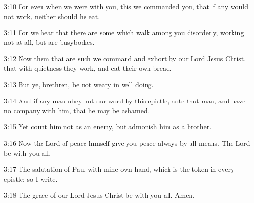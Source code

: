 3:10 For even when we were with you, this we commanded you, that if any would not work, neither should he eat.

3:11 For we hear that there are some which walk among you disorderly, working not at all, but are busybodies.

3:12 Now them that are such we command and exhort by our Lord Jesus Christ, that with quietness they work, and eat their own bread.

3:13 But ye, brethren, be not weary in well doing.

3:14 And if any man obey not our word by this epistle, note that man, and have no company with him, that he may be ashamed.

3:15 Yet count him not as an enemy, but admonish him as a brother.

3:16 Now the Lord of peace himself give you peace always by all means.  The Lord be with you all.

3:17 The salutation of Paul with mine own hand, which is the token in every epistle: so I write.

3:18 The grace of our Lord Jesus Christ be with you all. Amen.

